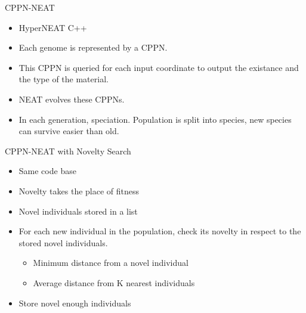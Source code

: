 \documentclass{beamer}
\begin{document}
\begin{frame}{CPPN-NEAT}
\begin{itemize}
\item HyperNEAT C++
\item Each genome is represented by a CPPN.
\item This CPPN is queried for each input coordinate to output the existance and the type of the material.
\item NEAT evolves these CPPNs.
\item In each generation, speciation. Population is split into species, new species can survive easier than old.
\end{itemize}
\end{frame}


\begin{frame}{CPPN-NEAT with Novelty Search~\cite{lehman2011abandoning}}
\begin{itemize}
\item Same code base
\item Novelty takes the place of fitness
\item Novel individuals stored in a list
\item For each new individual in the population, check its novelty in respect to the stored novel individuals.
\begin{itemize}
\item Minimum distance from a novel individual
\item Average distance from K nearest individuals
\end{itemize}
\item Store novel enough individuals
\end{itemize}
\end{frame}
\end{document}
